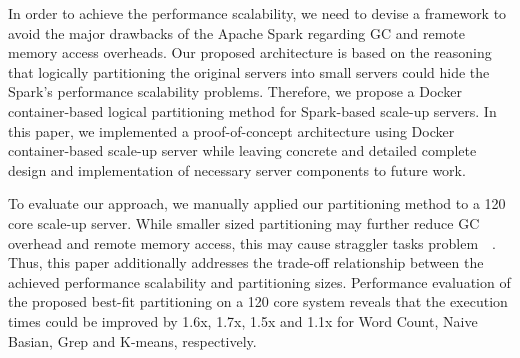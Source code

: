 In order to achieve the performance scalability, we need to devise a framework to avoid 
the major drawbacks of the Apache Spark regarding GC and remote memory access overheads.
Our proposed architecture is based on the reasoning that logically partitioning the original 
servers into small servers could hide the Spark's performance scalability problems. 
Therefore, we propose a Docker container-based logical partitioning method for Spark-based
scale-up servers. 
In this paper, we implemented a proof-of-concept architecture using Docker container-based
scale-up server while leaving concrete and detailed complete design and implementation of 
necessary server components to future work.

To evaluate our approach, we manually applied our partitioning method to a 120
core scale-up server.
While smaller sized partitioning may further reduce GC overhead and remote memory access,
this may cause straggler tasks
problem~\cite{Ousterhout2015MSP}~\cite{Ren2015HDS}.
Thus, this paper additionally addresses the trade-off relationship between 
the achieved performance scalability and partitioning sizes.
Performance evaluation of the proposed best-fit partitioning on a 120 core system
 reveals that the execution times could be improved by 1.6x, 1.7x, 1.5x and 1.1x
 for Word Count, Naive Basian, Grep and K-means, respectively.




